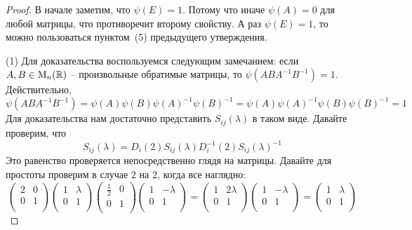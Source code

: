 \begin{proof}
В начале заметим, что $\psi(E) = 1$.
Потому что иначе $\psi(A) = 0$ для любой матрицы, что противоречит второму свойству.
А раз $\psi(E)=1$, то можно пользоваться пунктом~(5) предыдущего утверждения.

(1) Для доказательства воспользуемся следующим замечанием: если $A,B\in\operatorname{M}_{n}(\mathbb R)$ -- произвольные обратимые матрицы, то $\psi(ABA^{-1}B^{-1}) = 1$.
Действительно, 
\[
\psi(ABA^{-1}B^{-1}) = \psi(A)\psi(B)\psi(A)^{-1}\psi(B)^{-1}=\psi(A)\psi(A)^{-1}\psi(B)\psi(B)^{-1} = 1
\]
Для доказательства нам достаточно представить $S_{ij}(\lambda)$ в таком виде.
Давайте проверим, что 
\[
S_{ij}(\lambda) = D_i(2) S_{ij}(\lambda)D_i^{-1}(2)S_{ij}(\lambda)^{-1}
\]
Это равенство проверяется непосредственно глядя на матрицы.
Давайте для простоты проверим в случае $2$ на $2$, когда все наглядно:
\[
\begin{pmatrix}
{2}&{0}\\
{0}&{1}\\
\end{pmatrix}
\begin{pmatrix}
{1}&{\lambda}\\
{0}&{1}\\
\end{pmatrix}
\begin{pmatrix}
{\frac{1}{2}}&{0}\\
{0}&{1}\\
\end{pmatrix}
\begin{pmatrix}
{1}&{-\lambda}\\
{0}&{1}\\
\end{pmatrix}
=
\begin{pmatrix}
{1}&{2\lambda}\\
{0}&{1}\\
\end{pmatrix}
\begin{pmatrix}
{1}&{-\lambda}\\
{0}&{1}\\
\end{pmatrix}
=
\begin{pmatrix}
{1}&{\lambda}\\
{0}&{1}\\
\end{pmatrix}
\]


\end{proof}
